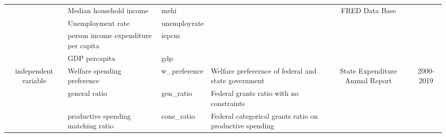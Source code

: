 \begin{table}
{\begin{tabular}{c|p{11.215em}|p{6.645em}|p{6.93em}|c|c}
            \cline{2-5}                                                   & Median household income                                       & mehi                                      & \multicolumn{1}{c|}{}                                   & \multicolumn{1}{c|}{\multirow{4}[8]{*}{FRED Data Base}}                  &                                                     \\
            \cline{2-3}                                                   & Unemployment rate                                             & unemployrate                              & \multicolumn{1}{c|}{}                                   &                                                                          &                                                     \\
            \cline{2-3}                                                   & person income expenditure per capita                          & iepcm                                     & \multicolumn{1}{c|}{}                                   &                                                                          &                                                     \\
            \cline{2-3}                                                   & GDP percapita                                                 & gdp                                       & \multicolumn{1}{c|}{}                                   &                                                                          &                                                     \\
            \hline
            \multicolumn{1}{c|}{\multirow{3}[6]{*}{independent variable}} & Welfare spending preference                                   & w\_preference                             & Welfare preferernce of federal and state government     & \multicolumn{1}{c|}{\multirow{3}[6]{*}{State Expenditure Annual Report}} & \multicolumn{1}{c}{\multirow{3}[6]{*}{2000-2019}}   \\
            \cline{2-4}                                                   & general ratio                                                 & gen\_ratio                                & Federal grants ratio with no constraints                &                                                                          &                                                     \\
            \cline{2-4}                                                   & productive spending matching ratio                            & cons\_ratio                               & Federal categorical grants ratio on productive spending &                                                                          &                                                     \\
            \hline
        \end{tabular}}%
    \label{datasource}%
\end{table}%
